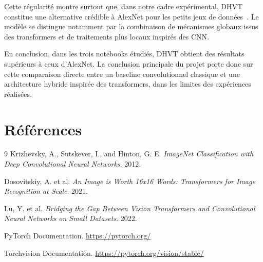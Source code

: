 \documentclass[11pt,a4paper]{article}
\begin{document}
Cette r\'egularit\'e montre surtout que, dans notre cadre exp\'erimental, DHVT constitue une alternative cr\'edible \`a AlexNet pour les petits jeux de donn\'ees~\cite{dhvt}. Le mod\`ele se distingue notamment par la combinaison de m\'ecanismes globaux issus des transformers et de traitements plus locaux inspir\'es des CNN.

En conclusion, dans les trois notebooks \'etudi\'es, DHVT obtient des r\'esultats sup\'erieurs \`a ceux d'AlexNet. La conclusion principale du projet porte donc sur cette comparaison directe entre un baseline convolutionnel classique et une architecture hybride inspir\'ee des transformers, dans les limites des exp\'eriences r\'ealis\'ees.

\section{R\'ef\'erences}
\begin{thebibliography}{9}
Krizhevsky, A., Sutskever, I., and Hinton, G. E.
\textit{ImageNet Classification with Deep Convolutional Neural Networks}. 2012.

Dosovitskiy, A. et al.
\textit{An Image is Worth 16x16 Words: Transformers for Image Recognition at Scale}. 2021.

Lu, Y. et al.
\textit{Bridging the Gap Between Vision Transformers and Convolutional Neural Networks on Small Datasets}. 2022.

PyTorch Documentation.
\url{https://pytorch.org/}

Torchvision Documentation.
\url{https://pytorch.org/vision/stable/}
\end{thebibliography}
\end{document}
